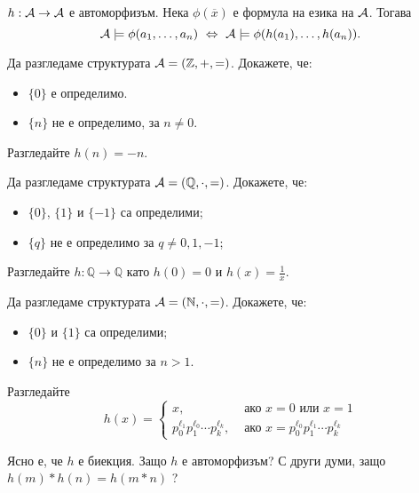 \begin{theorem}
  $h:\mathcal{A}\to\mathcal{A}$ е автоморфизъм. Нека $\phi(\overline{x})$ е формула на езика на $\mathcal{A}$. Тогава
  \[\mathcal{A} \models \phi(a_1,\dots,a_n) \ \Leftrightarrow\  \mathcal{A} \models \phi(h(a_1),\dots,h(a_n)).\]
\end{theorem}

\begin{problem}
  Да разгледаме структурата $\mathcal{A} = (\mathbb{Z},+,=)$.
  Докажете, че:
  \begin{itemize}
  \item 
    $\{0\}$ е определимо.
  \item
    $\{n\}$ не е определимо, за $n \neq 0$.
  \end{itemize}
\end{problem}
\begin{hint}
  Разгледайте $h(n) = -n$.
\end{hint}

\begin{problem}
  Да разгледаме структурата $\mathcal{A} = (\mathbb{Q}, \cdot, =)$.
  Докажете, че:
  \begin{itemize}
  \item
    $\{0\}$, $\{1\}$ и $\{-1\}$ са определими;
  \item
    $\{q\}$ не е определимо за $q \neq 0,1,-1$;
  \end{itemize}
\end{problem}
\begin{hint}
  Разгледайте $h:\mathbb{Q} \to \mathbb{Q}$ като
  $h(0) = 0$ и $h(x) = \frac{1}{x}$.  
\end{hint}

\begin{problem}
  Да разгледаме структурата $\mathcal{A} = (\mathbb{N}, \cdot ,=)$.
  Докажете, че:
  \begin{itemize}
  \item
    $\{0\}$ и $\{1\}$ са определими;
  \item
    $\{n\}$ не е определимо за $n > 1$.
  \end{itemize}
\end{problem}
\begin{hint}
  Разгледайте
  \[h(x) =
    \begin{cases}
      x, & \text{ ако }x = 0 \text{ или } x = 1\\
      p^{\ell_1}_0p^{\ell_0}_1\cdots p^{\ell_k}_k, & \text{ ако }x = p^{\ell_0}_0 p^{\ell_1}_1 \cdots p^{\ell_k}_k
    \end{cases}\]

  Ясно е, че $h$ е биекция. Защо $h$ е автоморфизъм?
  С други думи, защо $h(m) * h(n) = h(m*n)$ ?
\end{hint}


